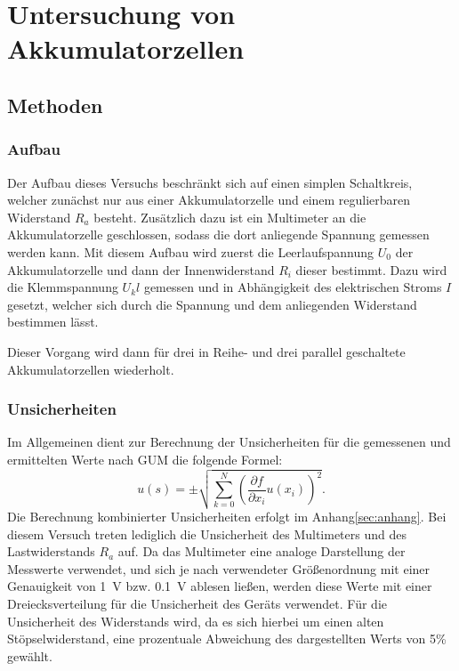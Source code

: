 \section{Untersuchung von Akkumulatorzellen} 



\subsection{Methoden}

\subsubsection{Aufbau}

Der Aufbau dieses Versuchs beschränkt sich auf einen simplen Schaltkreis, welcher zunächst nur aus einer Akkumulatorzelle und einem regulierbaren Widerstand $R_a$ besteht. 
Zusätzlich dazu ist ein Multimeter an die Akkumulatorzelle geschlossen, sodass die dort anliegende Spannung gemessen werden kann. 
Mit diesem Aufbau wird zuerst die Leerlaufspannung $U_0$ der Akkumulatorzelle und dann der Innenwiderstand $R_i$ dieser bestimmt.
Dazu wird die Klemmspannung $U_kl$ gemessen und in Abhängigkeit des elektrischen Stroms $I$ gesetzt, welcher sich durch die Spannung und dem anliegenden Widerstand bestimmen lässt.

Dieser Vorgang wird dann für drei in Reihe- und drei parallel geschaltete Akkumulatorzellen wiederholt. 

\subsubsection{Unsicherheiten}

Im Allgemeinen dient zur Berechnung der Unsicherheiten für die gemessenen und ermittelten Werte nach GUM die folgende Formel: 
\begin{equation*}
	u(s) = \pm \sqrt{\sum_{k=0}^{N}\left( \frac{\partial f}{\partial x_i}u(x_i)\right) ^2}. \label{eq:kombUnsicherheit}
\end{equation*}
Die Berechnung kombinierter Unsicherheiten erfolgt im Anhang\ref*{sec:anhang}.
Bei diesem Versuch treten lediglich die Unsicherheit des Multimeters und des Lastwiderstands $R_a$ auf. Da das Multimeter eine analoge Darstellung der Messwerte verwendet, und sich je nach verwendeter Größenordnung mit einer Genauigkeit von \SI{1}{V} bzw. \SI{0,1}{V} ablesen ließen, werden diese Werte mit einer Dreiecksverteilung für die Unsicherheit des Geräts verwendet.
Für die Unsicherheit des Widerstands wird, da es sich hierbei um einen alten Stöpselwiderstand, eine prozentuale Abweichung des dargestellten Werts von 5\% gewählt.

